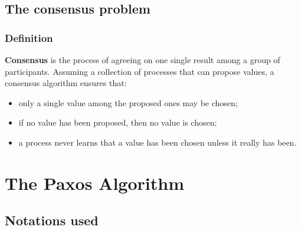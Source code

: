 \documentclass[10 pt]{beamer}
\begin{document}
\subsection{The consensus problem}


\begin{frame}
  \frametitle{Definition}
  
  \textbf{Consensus} is the process of agreeing on one single result among a group of participants. Assuming a collection of processes that can propose values, a consensus algorithm ensures that:
  
  \begin{itemize}
    \item only a single value among the proposed ones may be chosen;
    \item if no value has been proposed, then no value is chosen;
    \item a process never learns that a value has been chosen unless it really has been.
  \end{itemize}



\end{frame}



\section{The Paxos Algorithm}

\subsection{Notations used}
\end{document}
